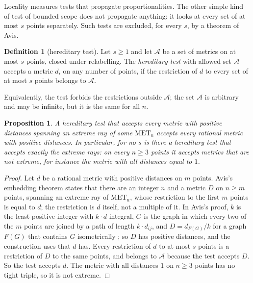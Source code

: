 \documentclass[11pt,a4paper]{article}
\newtheorem{proposition}[theorem]{Proposition}
\theoremstyle{definition}
\newtheorem*{definition}{Definition}
\theoremstyle{remark}
\newcommand{\MET}{\mathrm{MET}}
\begin{document}
Locality measures tests that propagate proportionalities. The other simple kind of test of bounded scope does not
propagate anything: it looks at every set of at most $s$ points separately. Such tests are excluded, for every $s$,
by a theorem of Avis.

\begin{definition}[hereditary test]
Let $s \ge 1$ and let $\mathcal{A}$ be a set of metrics on at most $s$ points, closed under relabelling. The
\emph{hereditary test} with allowed set $\mathcal{A}$ accepts a metric $d$, on any number of points, if the
restriction of $d$ to every set of at most $s$ points belongs to $\mathcal{A}$.
\end{definition}

Equivalently, the test forbids the restrictions outside $\mathcal{A}$; the set $\mathcal{A}$ is arbitrary and may be
infinite, but it is the same for all $n$.

\begin{proposition}\label{prop:hereditary}
A hereditary test that accepts every metric with positive distances spanning an extreme ray of some $\MET_n$
accepts every rational metric with positive distances. In particular, for no $s$ is there a hereditary test that
accepts exactly the extreme rays: on every $n \ge 3$ points it accepts metrics that are not extreme, for instance
the metric with all distances equal to $1$.
\end{proposition}

\begin{proof}
Let $d$ be a rational metric with positive distances on $m$ points. Avis's embedding theorem
\cite[Thm 3.5]{A80} states that there are an integer $n$ and a metric $D$ on $n \ge m$ points, spanning an extreme
ray of $\MET_n$, whose restriction to the first $m$ points is equal to $d$; the restriction is $d$ itself, not a
multiple of it. In Avis's proof, $k$ is the least positive integer with $k\cdot d$ integral, $G$ is the graph in
which every two of the $m$ points are joined by a path of length $k\cdot d_{ij}$, and $D = d_{F(G)}/k$ for a graph
$F(G)$ that contains $G$ isometrically \cite[Lemma 3.4]{A80}; so $D$ has positive distances, and the construction
uses that $d$ has. Every restriction of $d$ to at most $s$ points is a restriction of $D$ to the same points, and
belongs to $\mathcal{A}$ because the test accepts $D$. So the test accepts $d$. The metric with all distances $1$
on $n \ge 3$ points has no tight triple, so it is not extreme.
\end{proof}
\end{document}
